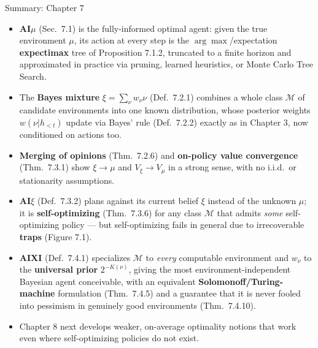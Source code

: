 \documentclass[aspectratio=169,10pt]{beamer}
\newcommand{\Mcal}{\mathcal{M}}
\begin{document}
\begin{frame}{Summary: Chapter 7}
  \begin{itemize}
    \item \textbf{AI$\mu$} (Sec.\ 7.1) is the fully-informed optimal agent:
      given the true environment $\mu$, its action at every step is the
      $\arg\max$/expectation \textbf{expectimax} tree of Proposition 7.1.2,
      truncated to a finite horizon and approximated in practice via
      pruning, learned heuristics, or Monte Carlo Tree Search.
    \item The \textbf{Bayes mixture} $\xi=\sum_\nu w_\nu\nu$ (Def.\ 7.2.1)
      combines a whole class $\Mcal$ of candidate environments into one
      known distribution, whose posterior weights $w(\nu|h_{<t})$ update via
      Bayes' rule (Def.\ 7.2.2) exactly as in Chapter 3, now conditioned on
      actions too.
    \item \textbf{Merging of opinions} (Thm.\ 7.2.6) and \textbf{on-policy
      value convergence} (Thm.\ 7.3.1) show $\xi\to\mu$ and $V_\xi\to V_\mu$
      in a strong sense, with no i.i.d.\ or stationarity assumptions.
    \item \textbf{AI$\xi$} (Def.\ 7.3.2) plans against its current belief
      $\xi$ instead of the unknown $\mu$; it is \textbf{self-optimizing}
      (Thm.\ 7.3.6) for any class $\Mcal$ that admits \emph{some}
      self-optimizing policy --- but self-optimizing fails in general due to
      irrecoverable \textbf{traps} (Figure 7.1).
    \item \textbf{AIXI} (Def.\ 7.4.1) specializes $\Mcal$ to \emph{every}
      computable environment and $w_\nu$ to the \textbf{universal prior}
      $2^{-K(\nu)}$, giving the most environment-independent Bayesian agent
      conceivable, with an equivalent \textbf{Solomonoff/Turing-machine}
      formulation (Thm.\ 7.4.5) and a guarantee that it is never fooled into
      pessimism in genuinely good environments (Thm.\ 7.4.10).
    \item Chapter 8 next develops weaker, on-average optimality notions
      that work even where self-optimizing policies do not exist.
  \end{itemize}
\end{frame}
\end{document}
